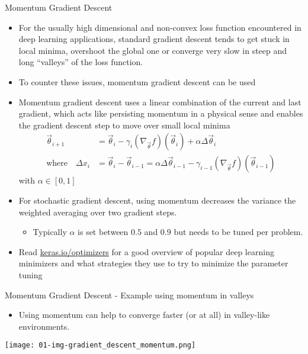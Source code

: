   \begin{frame}{Momentum Gradient Descent}
    \begin{itemize}
      \item For the usually high dimensional and non-convex loss function encountered in deep learning applications, standard gradient descent tends to get stuck in local minima, overshoot the global one or converge very slow in steep and long \enquote{valleys} of the loss function.
      \item To counter these issues, momentum gradient descent can be used
      \item Momentum gradient descent uses a linear combination of the current and last gradient, which acts like persisting momentum in a physical sense and enables the gradient descent step to move over small local minima
      \begin{align*}
        \vec{\theta}_{i+1} &= \vec{\theta}_i
          - \gamma_i (\nabla_{\vec{\theta}}f)(\vec{\theta}_i)
          + \alpha\Delta \vec{\theta}_i \\
        \text{where}\quad \Delta x_i &= \vec{\theta}_i - \vec{\theta}_{i-1}
          = \alpha \Delta \vec{\theta}_{i-1}
            - \gamma_{i-1} (\nabla_{\vec{\theta}}f)(\vec{\theta}_{i-1})
      \end{align*}
      with $\alpha\in[0, 1]$
      \item For stochastic gradient descent, using momentum decreases the variance the weighted averaging over two gradient steps.
      \begin{itemize}
        \item Typically $\alpha$ is set between $0.5$ and $0.9$ but needs to be tuned per problem.
      \end{itemize}
      \item Read \url{keras.io/optimizers} for a good overview of popular deep learning minimizers and what strategies they use to try to minimize the parameter tuning
    \end{itemize}
  \end{frame}

  \begin{frame}{Momentum Gradient Descent - Example using momentum in valleys}
    \begin{itemize}
      \item Using momentum can help to converge faster (or at all) in valley-like environments.
    \end{itemize}
    \texttt{[image: 01-img-gradient\_descent\_momentum.png]}
  \end{frame}

